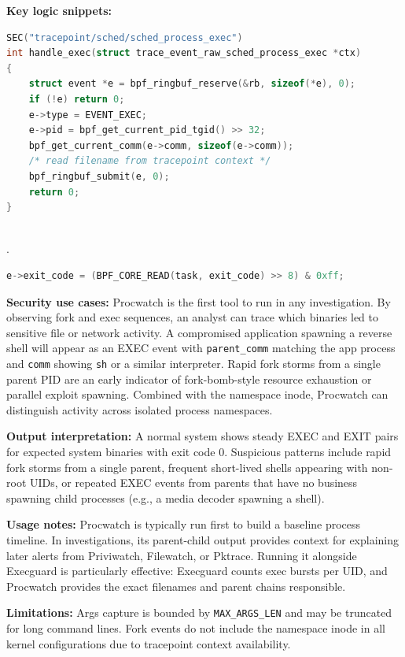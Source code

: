 \documentclass{mnitjaipur}
\begin{document}
\textbf{Key logic snippets:}
\begin{lstlisting}[language=C,caption={Procwatch exec handler}]
SEC("tracepoint/sched/sched_process_exec")
int handle_exec(struct trace_event_raw_sched_process_exec *ctx)
{
    struct event *e = bpf_ringbuf_reserve(&rb, sizeof(*e), 0);
    if (!e) return 0;
    e->type = EVENT_EXEC;
    e->pid = bpf_get_current_pid_tgid() >> 32;
    bpf_get_current_comm(e->comm, sizeof(e->comm));
    /* read filename from tracepoint context */
    bpf_ringbuf_submit(e, 0);
    return 0;
}
\end{lstlisting}
\\.
\begin{lstlisting}[language=C,caption={Procwatch exit code extraction via CO-RE}]
e->exit_code = (BPF_CORE_READ(task, exit_code) >> 8) & 0xff;
\end{lstlisting}

\textbf{Security use cases:} Procwatch is the first tool to run in any investigation. By observing fork and exec sequences, an analyst can trace which binaries led to sensitive file or network activity. A compromised application spawning a reverse shell will appear as an EXEC event with \texttt{parent\_comm} matching the app process and \texttt{comm} showing \texttt{sh} or a similar interpreter. Rapid fork storms from a single parent PID are an early indicator of fork-bomb-style resource exhaustion or parallel exploit spawning. Combined with the namespace inode, Procwatch can distinguish activity across isolated process namespaces.

\textbf{Output interpretation:} A normal system shows steady EXEC and EXIT pairs for expected system binaries with exit code 0. Suspicious patterns include rapid fork storms from a single parent, frequent short-lived shells appearing with non-root UIDs, or repeated EXEC events from parents that have no business spawning child processes (e.g., a media decoder spawning a shell).

\textbf{Usage notes:} Procwatch is typically run first to build a baseline process timeline. In investigations, its parent-child output provides context for explaining later alerts from Priviwatch, Filewatch, or Pktrace. Running it alongside Execguard is particularly effective: Execguard counts exec bursts per UID, and Procwatch provides the exact filenames and parent chains responsible.

\textbf{Limitations:} Args capture is bounded by \texttt{MAX\_ARGS\_LEN} and may be truncated for long command lines. Fork events do not include the namespace inode in all kernel configurations due to tracepoint context availability.
\end{document}

